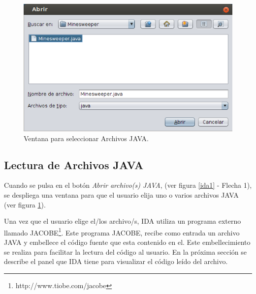 \begin{figure}[t] %
\centerline{%
\includegraphics[scale= 0.7]{./cap4/ida_02.png}
}
\caption{Ventana para seleccionar Archivos JAVA.}
\label{ida2}
\end{figure}

\vspace{-1em}

\subsection{Lectura de Archivos JAVA}

Cuando se pulsa en el botón \textit{Abrir archivo(s) JAVA}, (ver figura \ref{ida1} - Flecha 1), se despliega una ventana para que el usuario elija uno o varios archivos JAVA (ver figura \ref{ida2}). 


Una vez que el usuario elige el/los archivo/s, IDA utiliza un  programa externo llamado JACOBE\footnote[1]{http://www.tiobe.com/jacobe}. Este programa JACOBE, recibe como entrada un archivo JAVA y embellece el código fuente que esta contenido en el. Este embellecimiento se realiza para facilitar la lectura del código al usuario. En la próxima sección se describe el panel que IDA tiene para visualizar el código leído del archivo.



